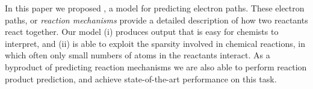 
In this paper we proposed \ourModel, a model for predicting electron paths.
These electron paths, or {\em reaction mechanisms} provide a detailed description of how two reactants react together. 
Our model (i) produces output that is easy for chemists to interpret, and (ii) is able to exploit the sparsity involved in chemical reactions, in which often only small numbers of atoms in the reactants interact.
As a byproduct of predicting reaction mechanisms we are also able to perform reaction product prediction,
 and achieve state-of-the-art performance on this task.
%
%
%
%
%

